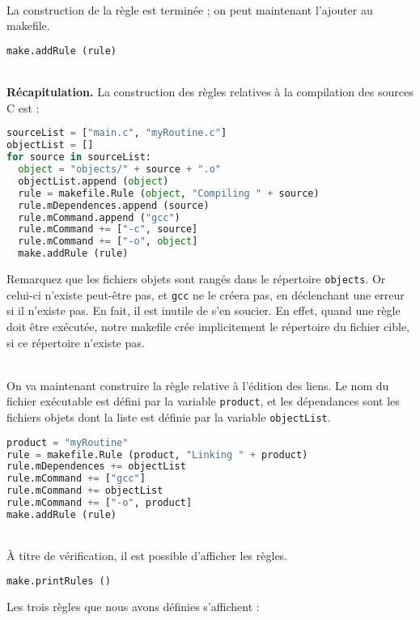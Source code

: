\documentclass[a4paper,12pt,obeyspaces,openany]{extarticle}
\begin{document}
~\\La construction de la règle est terminée ; on peut maintenant l'ajouter au makefile.
\begin{lstlisting}[language=py]
  make.addRule (rule)
\end{lstlisting}


~\\{\bf Récapitulation.} La construction des règles relatives à la compilation des sources C est :
\begin{lstlisting}[language=py]
sourceList = ["main.c", "myRoutine.c"]
objectList = []
for source in sourceList:
  object = "objects/" + source + ".o"
  objectList.append (object)
  rule = makefile.Rule (object, "Compiling " + source)
  rule.mDependences.append (source)
  rule.mCommand.append ("gcc")
  rule.mCommand += ["-c", source]
  rule.mCommand += ["-o", object]
  make.addRule (rule)
\end{lstlisting}
Remarquez que les fichiers objets sont rangés dans le répertoire \texttt{objects}. Or celui-ci n'existe peut-être pas, et \texttt{gcc} ne le créera pas, en déclenchant une erreur si il n'existe pas. En fait, il est inutile de s'en soucier. En effet, quand une règle doit être exécutée, notre makefile crée implicitement le répertoire du fichier cible, si ce répertoire n'existe pas.

~\\On va maintenant construire la règle relative à l'édition des liens. Le nom du fichier exécutable est défini par la variable \texttt{product}, et les dépendances sont les fichiers objets dont la liste est définie par la variable \texttt{objectList}.
\begin{lstlisting}[language=py]
product = "myRoutine"
rule = makefile.Rule (product, "Linking " + product)
rule.mDependences += objectList
rule.mCommand += ["gcc"]
rule.mCommand += objectList
rule.mCommand += ["-o", product]
make.addRule (rule)
\end{lstlisting}

~\\À titre de vérification, il est possible d'afficher les règles.
\begin{lstlisting}[language=py]
make.printRules ()
\end{lstlisting}

Les trois règles que nous avons définies s'affichent :
\end{document}
